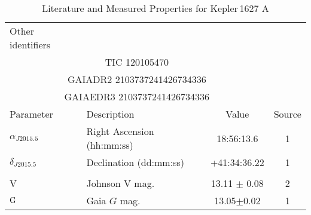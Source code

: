 \begin{table*}
\scriptsize
\setlength{\tabcolsep}{2pt}
\centering
\caption{Literature and Measured Properties for Kepler$\,$1627 A}
\label{tab:starparams}
\begin{tabular}{llcc}
  \hline
  \hline
Other identifiers\dotfill & \\
\multicolumn{3}{c}{TIC 120105470} \\
\multicolumn{3}{c}{GAIADR2 2103737241426734336} \\
\multicolumn{3}{c}{GAIAEDR3 2103737241426734336} \\
\hline
\hline
Parameter & Description & Value & Source\\
\hline 
$\alpha_{J2015.5}$\dotfill	&Right Ascension (hh:mm:ss)\dotfill & 18:56:13.6 & 1	\\
$\delta_{J2015.5}$\dotfill	&Declination (dd:mm:ss)\dotfill & +41:34:36.22 & 1	\\
\\
V\dotfill			&Johnson V mag.\dotfill & 13.11 $\pm$ 0.08		& 2	\\
${\rm G}$\dotfill     & Gaia $G$ mag.\dotfill     & 13.05$\pm$0.02 & 1\\

\end{tabular}
\end{table*}
